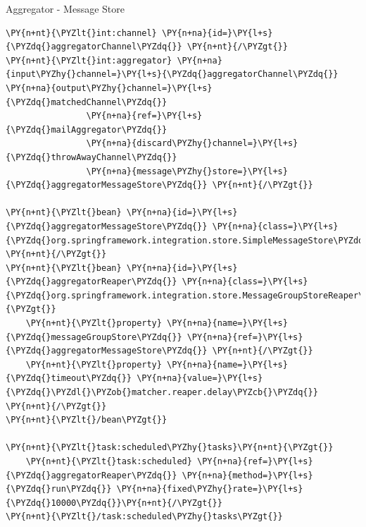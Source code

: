 \documentclass{beamer}
\begin{document}
\begin{frame}[fragile]{Aggregator - Message Store}
\begin{Verbatim}[fontsize=\tiny,commandchars=\\\{\}]
\PY{n+nt}{\PYZlt{}int:channel} \PY{n+na}{id=}\PY{l+s}{\PYZdq{}aggregatorChannel\PYZdq{}} \PY{n+nt}{/\PYZgt{}}
\PY{n+nt}{\PYZlt{}int:aggregator} \PY{n+na}{input\PYZhy{}channel=}\PY{l+s}{\PYZdq{}aggregatorChannel\PYZdq{}} \PY{n+na}{output\PYZhy{}channel=}\PY{l+s}{\PYZdq{}matchedChannel\PYZdq{}} 
                \PY{n+na}{ref=}\PY{l+s}{\PYZdq{}mailAggregator\PYZdq{}} 
                \PY{n+na}{discard\PYZhy{}channel=}\PY{l+s}{\PYZdq{}throwAwayChannel\PYZdq{}} 
                \PY{n+na}{message\PYZhy{}store=}\PY{l+s}{\PYZdq{}aggregatorMessageStore\PYZdq{}} \PY{n+nt}{/\PYZgt{}}

\PY{n+nt}{\PYZlt{}bean} \PY{n+na}{id=}\PY{l+s}{\PYZdq{}aggregatorMessageStore\PYZdq{}} \PY{n+na}{class=}\PY{l+s}{\PYZdq{}org.springframework.integration.store.SimpleMessageStore\PYZdq{}} \PY{n+nt}{/\PYZgt{}}
\PY{n+nt}{\PYZlt{}bean} \PY{n+na}{id=}\PY{l+s}{\PYZdq{}aggregatorReaper\PYZdq{}} \PY{n+na}{class=}\PY{l+s}{\PYZdq{}org.springframework.integration.store.MessageGroupStoreReaper\PYZdq{}}\PY{n+nt}{\PYZgt{}}
    \PY{n+nt}{\PYZlt{}property} \PY{n+na}{name=}\PY{l+s}{\PYZdq{}messageGroupStore\PYZdq{}} \PY{n+na}{ref=}\PY{l+s}{\PYZdq{}aggregatorMessageStore\PYZdq{}} \PY{n+nt}{/\PYZgt{}}
    \PY{n+nt}{\PYZlt{}property} \PY{n+na}{name=}\PY{l+s}{\PYZdq{}timeout\PYZdq{}} \PY{n+na}{value=}\PY{l+s}{\PYZdq{}\PYZdl{}\PYZob{}matcher.reaper.delay\PYZcb{}\PYZdq{}} \PY{n+nt}{/\PYZgt{}}
\PY{n+nt}{\PYZlt{}/bean\PYZgt{}}

\PY{n+nt}{\PYZlt{}task:scheduled\PYZhy{}tasks}\PY{n+nt}{\PYZgt{}}
    \PY{n+nt}{\PYZlt{}task:scheduled} \PY{n+na}{ref=}\PY{l+s}{\PYZdq{}aggregatorReaper\PYZdq{}} \PY{n+na}{method=}\PY{l+s}{\PYZdq{}run\PYZdq{}} \PY{n+na}{fixed\PYZhy{}rate=}\PY{l+s}{\PYZdq{}10000\PYZdq{}}\PY{n+nt}{/\PYZgt{}}
\PY{n+nt}{\PYZlt{}/task:scheduled\PYZhy{}tasks\PYZgt{}}
\end{Verbatim}
\end{frame}
\end{document}
